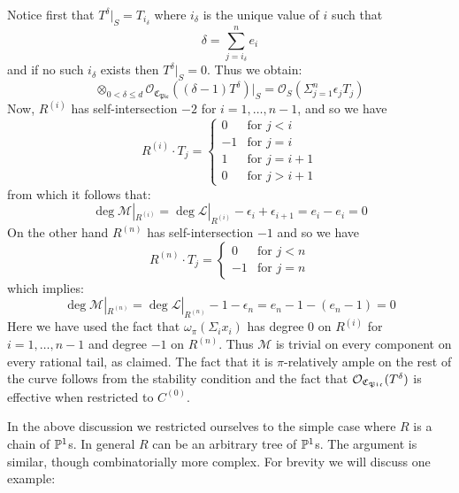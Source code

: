 Notice first that $T^\delta|_S = T_{i_\delta}$ where $i_\delta$ is the unique value of $i$ such that
\begin{equation*} \delta = \sum_{j=i_{\delta}}^n e_i \end{equation*}
and if no such $i_\delta$ exists then $T^\delta|_S = 0$. Thus we obtain:
\begin{equation*} \otimes_{0<\delta\leq d}\mathcal{O}_{\mathfrak{C}_{\mathfrak{Pic}}}((\delta-1) T^\delta)|_S = \mathcal{O}_S(\Sigma_{j=1}^n \epsilon_j T_j) \end{equation*}
Now, $R^{(i)}$ has self-intersection $-2$ for $i=1,\ldots,n-1$, and so we have
\begin{equation*}
R^{(i)}\cdot T_j =
  \begin{cases}
    0 & \text{for } j<i \\
    -1 & \text{for } j=i \\
    1 & \text{for } j=i+1 \\
    0 & \text{for } j>i+1
  \end{cases}
\end{equation*}
from which it follows that:
\begin{equation*} \deg \mathcal{M}|_{R^{(i)}} = \deg \mathcal{L}|_{R^{(i)}} - \epsilon_i + \epsilon_{i+1} = e_i - e_i = 0 \end{equation*}
On the other hand $R^{(n)}$ has self-intersection $-1$ and so we have
\begin{equation*}
R^{(n)} \cdot T_j =
\begin{cases}
0 & \text{for } j < n \\
-1 & \text{for } j = n
\end{cases}
\end{equation*}
which implies:
\begin{equation*} \deg \mathcal{M}|_{R^{(n)}} = \deg \mathcal{L}|_{R^{(n)}} - 1 - \epsilon_n = e_n - 1 - (e_n-1) = 0\end{equation*}
Here we have used the fact that $\omega_\pi(\Sigma_i x_i)$ has degree $0$ on $R^{(i)}$ for $i=1,\ldots,n-1$ and degree $-1$ on $R^{(n)}$. Thus $\mathcal{M}$ is trivial on every component on every rational tail, as claimed. The fact that it is $\pi$-relatively ample on the rest of the curve follows from the stability condition and the fact that $\mathcal{O}_{\mathfrak{C}_{\mathfrak{Pic}}}(T^\delta)$ is effective when restricted to $C^{(0)}$.

In the above discussion we restricted ourselves to the simple case where $R$ is a chain of $\mathbb P^1$s. In general $R$ can be an arbitrary tree of $\mathbb P^1$s. The argument is similar, though combinatorially more complex. For brevity we will discuss one example:

